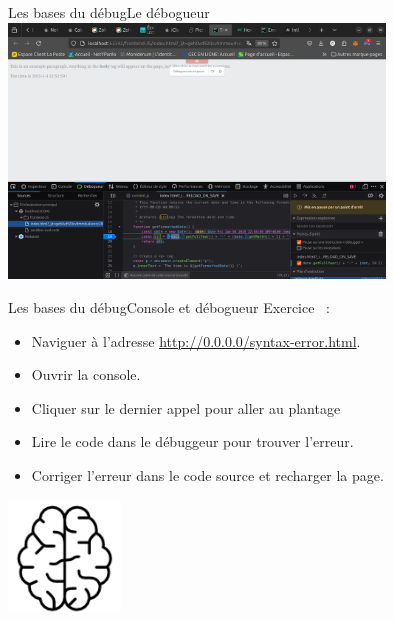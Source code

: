 \documentclass{beamer}
\begin{document}
    \begin{frame}{Les bases du débug}{Le débogueur}
        \bigbreak
        \centering
        \includegraphics[width=10cm]{image/js-debugger}
    \end{frame}

    \begin{frame}{Les bases du débug}{Console et débogueur}
        Exercice \execcounterdispinc{}~:
        \begin{itemize}
            \item Naviguer à l'adresse \url{http://0.0.0.0/syntax-error.html}.
            \item Ouvrir la console.
            \item Cliquer sur le dernier appel pour aller au plantage
            \item Lire le code dans le débuggeur pour trouver l'erreur.
            \item Corriger l'erreur dans le code source et recharger la page.
        \end{itemize}
        \bigbreak
        \centering
        \includegraphics[width=3cm]{image/intelligence}
    \end{frame}
\end{document}
